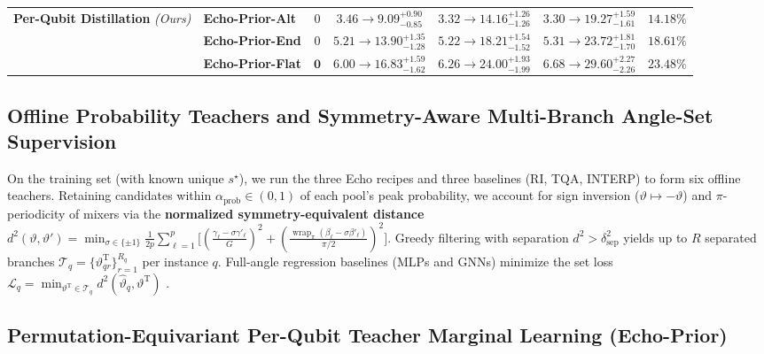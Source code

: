 \documentclass{article}
\theoremstyle{plain}
\theoremstyle{definition}
\begin{document}
\begin{table}[t]
{\begin{tabular}{llccccc}
\midrule
\textbf{Per-Qubit Distillation} \emph{(Ours)} & \textbf{Echo-Prior-Alt} & $0$ & $3.46 \rightarrow\allowbreak 9.09^{+0.90}_{-0.85}$ & $3.32 \rightarrow\allowbreak 14.16^{+1.26}_{-1.26}$ & $3.30 \rightarrow\allowbreak 19.27^{+1.59}_{-1.61}$ & $14.18\%$ \\
 & \textbf{Echo-Prior-End} & $0$ & $5.21 \rightarrow\allowbreak 13.90^{+1.35}_{-1.28}$ & $5.22 \rightarrow\allowbreak 18.21^{+1.54}_{-1.52}$ & $5.31 \rightarrow\allowbreak 23.72^{+1.81}_{-1.70}$ & $18.61\%$ \\
 & \textbf{Echo-Prior-Flat} & $\mathbf{0}$ & $6.00 \rightarrow\allowbreak 16.83^{+1.59}_{-1.62}$ & $6.26 \rightarrow\allowbreak \mathbf{24.00}^{+1.93}_{-1.99}$ & $6.68 \rightarrow\allowbreak \mathbf{29.60}^{+2.27}_{-2.26}$ & $\mathbf{23.48}\%$ \\
\bottomrule
\end{tabular}%
}
\vskip -0.02in
\end{table}

\subsection{Offline Probability Teachers and Symmetry-Aware Multi-Branch Angle-Set Supervision}\label{subsec:4_3}

On the training set (with known unique $s^\star$), we run the three Echo recipes and three baselines (RI, TQA, INTERP) to form six offline teachers. Retaining candidates within $\alpha_{\mathrm{prob}}\in(0,1)$ of each pool's peak probability, we account for sign inversion ($\vartheta\mapsto -\vartheta$) and $\pi$-periodicity of mixers \citep{lotshaw2021empirical,shaydulin2021classical} via the \textbf{normalized symmetry-equivalent distance} $d^2(\vartheta,\vartheta')=\min_{\sigma\in\{\pm 1\}}\frac{1}{2p}\sum_{\ell=1}^p\big[(\frac{\gamma_\ell-\sigma\gamma'_\ell}{G})^2+(\frac{\operatorname{wrap}_{\pi}(\beta_\ell-\sigma\beta'_\ell)}{\pi/2})^2\big]$. Greedy filtering with separation $d^2>\delta_{\mathrm{sep}}^2$ yields up to $R$ separated branches $\mathcal T_q=\{\vartheta_{qr}^{\mathrm T}\}_{r=1}^{R_q}$ per instance $q$. Full-angle regression baselines (MLPs and GNNs) \citep{amosy2024iteration,jain2022graph,liang2024invited} minimize the set loss $\mathcal L_q=\min_{\vartheta^{\mathrm T}\in\mathcal T_q}d^2(\widehat\vartheta_q,\vartheta^{\mathrm T})$ \citep{rupprecht2017learning,zhang2019deep}.

\subsection{Permutation-Equivariant Per-Qubit Teacher Marginal Learning (Echo-Prior)}\label{subsec:4_4}
\end{document}
